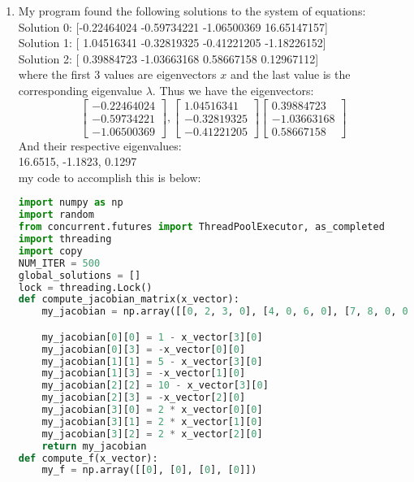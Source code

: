 \documentclass{article}
\begin{document}
\begin{enumerate}[label=\alph*.)]
\item My program found the following solutions to the system of equations: \\
Solution 0:  [-0.22464024 -0.59734221 -1.06500369 16.65147157]\\
Solution 1:  [ 1.04516341 -0.32819325 -0.41221205 -1.18226152]\\
Solution 2:  [ 0.39884723 -1.03663168  0.58667158  0.12967112]\\
where the first 3 values are eigenvectors $x$ and the last value is the corresponding eigenvalue $\lambda$. Thus we have the eigenvectors:\\ 
\[
\begin{bmatrix}
-0.22464024 \\-0.59734221\\ -1.06500369
\end{bmatrix},
\begin{bmatrix}
 1.04516341 \\ -0.32819325\\ -0.41221205
\end{bmatrix}
\begin{bmatrix}
 0.39884723 \\ -1.03663168 \\ 0.58667158
\end{bmatrix}
\]
And their respective eigenvalues:\\
16.6515, -1.1823, 0.1297 \\
my code to accomplish this is below:\\
\begin{lstlisting}[language=Python]
import numpy as np
import random
from concurrent.futures import ThreadPoolExecutor, as_completed
import threading
import copy
NUM_ITER = 500
global_solutions = []
lock = threading.Lock()
def compute_jacobian_matrix(x_vector):
    my_jacobian = np.array([[0, 2, 3, 0], [4, 0, 6, 0], [7, 8, 0, 0], [0, 0 , 0, 0]])

    my_jacobian[0][0] = 1 - x_vector[3][0]
    my_jacobian[0][3] = -x_vector[0][0]
    my_jacobian[1][1] = 5 - x_vector[3][0]
    my_jacobian[1][3] = -x_vector[1][0]
    my_jacobian[2][2] = 10 - x_vector[3][0]
    my_jacobian[2][3] = -x_vector[2][0]
    my_jacobian[3][0] = 2 * x_vector[0][0]
    my_jacobian[3][1] = 2 * x_vector[1][0]
    my_jacobian[3][2] = 2 * x_vector[2][0]
    return my_jacobian
def compute_f(x_vector):
    my_f = np.array([[0], [0], [0], [0]])


\end{lstlisting}
\end{enumerate}
\end{document}
